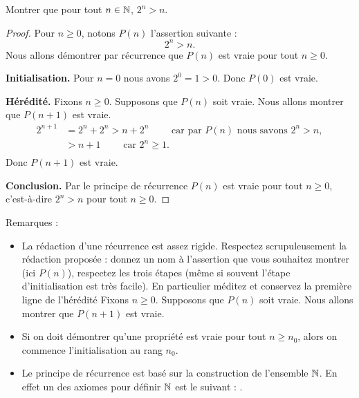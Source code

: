 \documentclass[11pt,class=report,crop=false]{standalone}
\begin{document}
\begin{exemple}
Montrer que pour tout $n\in \mathbb{N}$, $2^n > n$.

\begin{proof}
Pour $n\ge 0$, notons $P(n)$ l'assertion suivante :
$$2^n > n.$$
Nous allons démontrer par récurrence que $P(n)$ est vraie pour tout $n\ge 0$.


\textbf{Initialisation.} Pour $n=0$ nous avons $2^0=1>0$. Donc $P(0)$ est vraie.

\textbf{Hérédité.}
Fixons $n\ge 0$. Supposons que $P(n)$ soit vraie. Nous allons montrer que $P(n+1)$ est vraie.
\begin{align*}
 2^{n+1} &= 2^n + 2^n 
         > n + 2^n \qquad \text{ car par } P(n) \text{ nous savons } 2^n > n, \\
         &> n + 1 \qquad \text{ car } 2^n \ge 1. \\
\end{align*}
Donc $P(n+1)$ est vraie.



\textbf{Conclusion.} Par le principe de récurrence $P(n)$ est vraie pour tout $n\ge 0$, c'est-à-dire
$2^n > n$ pour tout $n\ge 0$.
\end{proof}
\end{exemple}

Remarques :
\begin{itemize}
  \item La rédaction d'une récurrence est assez rigide. Respectez scrupuleusement la rédaction
proposée : donnez un nom à l'assertion que vous souhaitez montrer (ici $P(n)$), respectez les trois étapes
(même si souvent l'étape d'initialisation est très facile).
En particulier méditez et conservez la première ligne de l'hérédité \og Fixons $n\ge 0$.
Supposons que $P(n)$ soit vraie. Nous allons montrer que $P(n+1)$ est vraie.\fg

  \item Si on doit démontrer qu'une propriété est vraie pour tout $n\ge n_0$, alors on commence l'initialisation au rang $n_0$.

  \item Le principe de récurrence est basé sur la construction de l'ensemble $\mathbb{N}$. En effet un des axiomes
pour définir $\mathbb{N}$ est le suivant :
.
\end{itemize}


\end{document}
